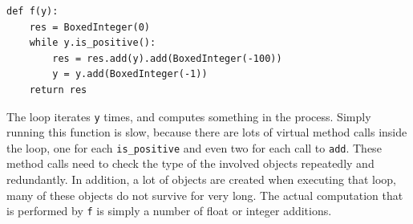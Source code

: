 \documentclass{sigplanconf}
\begin{document}
\begin{verbatim}
def f(y):
    res = BoxedInteger(0)
    while y.is_positive():
        res = res.add(y).add(BoxedInteger(-100))
        y = y.add(BoxedInteger(-1))
    return res
\end{verbatim}

The loop iterates \texttt{y} times, and computes something in the process.
Simply running this function is slow, because there are lots of virtual method
calls inside the loop, one for each \texttt{is\_positive} and even two for each
call to \texttt{add}. These method calls need to check the type of the involved
objects repeatedly and redundantly. In addition, a lot of objects are created
when executing that loop, many of these objects do not survive for very long.
The actual computation that is performed by \texttt{f} is simply a number of
float or integer additions.
\end{document}
